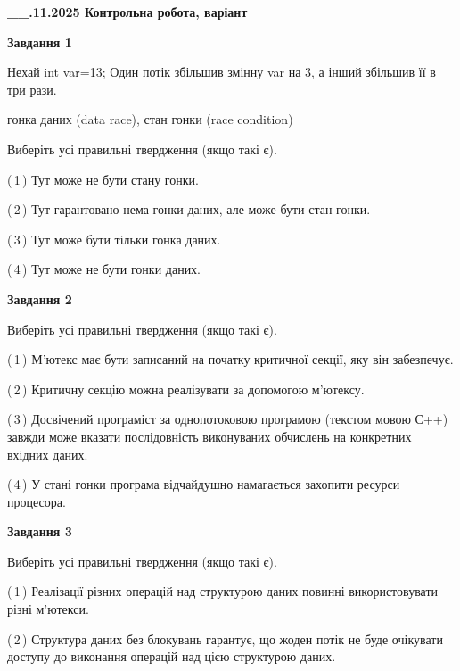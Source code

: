 \documentclass[12pt, ukrainian]{article}
\begin{document}
\begin {large}

\textbf{\_\_.11.2025 Контрольна робота, варіант  }\par


{

\begin{center}
\textbf{Завдання 1}
\end{center}
Нехай int var=13; Один потік збільшив змінну var на 3, а інший збільшив її в три рази.

гонка даних (data race), стан гонки (race condition)

Виберіть усі правильні твердження (якщо такі є).\par
\vspace{2mm}
(\,1\,) Тут може не бути стану гонки.%

(\,2\,) Тут гарантовано нема гонки даних, але може бути стан гонки.%

(\,3\,) Тут може бути тільки гонка даних.%

(\,4\,) Тут може не бути гонки даних.%



\begin{center}
\textbf{Завдання 2}
\end{center}
Виберіть усі правильні твердження (якщо такі є).\par
\vspace{2mm}

(\,1\,) М’ютекс має бути записаний на початку критичної секції, яку він забезпечує.%

(\,2\,) Критичну секцію можна реалізувати за допомогою м’ютексу.%

(\,3\,) Досвічений програміст за однопотоковою програмою (текстом мовою С++) завжди може вказати послідовність виконуваних обчислень на конкретних вхідних даних.%

(\,4\,) У стані гонки програма відчайдушно намагається захопити ресурси процесора.%



\begin{center}
\textbf{Завдання 3}
\end{center}
Виберіть усі правильні твердження (якщо такі є).\par
\vspace{2mm}

(\,1\,) Реалізації різних операцій над структурою даних повинні використовувати різні м’ютекси.%

(\,2\,) Структура даних без блокувань гарантує, що жоден потік не буде очікувати доступу до виконання операцій над цією структурою даних.%

}
\end{large}
\end{document}
